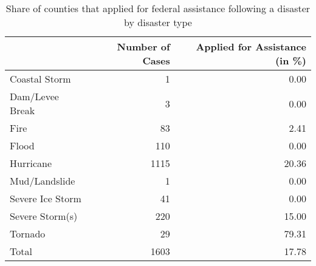 \begin{table}

\caption{\label{tab:AppsByType}Share of counties that applied for federal assistance following a disaster by disaster type}
\centering
\begin{tabular}[t]{l|r|r}
\hline
  & Number of Cases & Applied for Assistance (in \%)\\
\hline
Coastal Storm & 1 & 0.00\\
\hline
Dam/Levee Break & 3 & 0.00\\
\hline
Fire & 83 & 2.41\\
\hline
Flood & 110 & 0.00\\
\hline
Hurricane & 1115 & 20.36\\
\hline
Mud/Landslide & 1 & 0.00\\
\hline
Severe Ice Storm & 41 & 0.00\\
\hline
Severe Storm(s) & 220 & 15.00\\
\hline
Tornado & 29 & 79.31\\
\hline
Total & 1603 & 17.78\\
\hline
\end{tabular}
\end{table}
